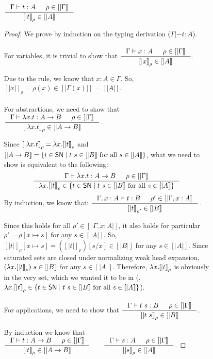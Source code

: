 \begin{figure}
\begin{theorem}
$ \inference{\Gamma|- t:A & \rho \in [|\Gamma|]}{[|t|]_\rho \in [|A|]} $
\end{theorem}
\begin{proof}
We prove by induction on the typing derivation ($\Gamma|- t:A$).
\paragraph{}
For variables, it is trivial to show that
$ \inference{\Gamma |- x:A & \rho \in [|\Gamma|]}{[|x|]_\rho \in [|A|]} $.

Due to the  rule, we know that $x:A \in \Gamma$.
So, $[|x|]_\rho =\rho(x)\in[|\Gamma(x)|] = [|A|]$.

\paragraph{}
For abstractions, we need to show that
$ \inference{\Gamma |- \l x.t : A -> B & \rho \in [|\Gamma|]}
	     {[|\l x.t|]_\rho \in [|A -> B|]} $.

Since $[|\lambda x.t|]_\rho = \lambda x.[|t|]_\rho$ and
$[|A -> B|] = \{ t\in \mathsf{SN} \mid t~s\in[|B|]~\text{for all}~s\in[|A|] \}$,
what we need to show is equivalent to the following:
\[ \inference{\Gamma |- \l x.t : A -> B & \rho \in [|\Gamma|]}
	     {\l x.[|t|]_\rho \in
		\{ t\in \SN \mid t~s\in[|B|] ~\text{for all}~ s\in[|A|] \} }
\]
By induction, we know that:
$ \inference{\Gamma,x:A |- t : B & \rho' \in [|\Gamma,x:A|]}
	     {[|t|]_{\rho'} \in [|B|]} $.

Since this holds for all $\rho' \in [|\Gamma,x:A|]$, it also holds
for particular $\rho' = \rho[x \mapsto s]$ for any $s \in [|A|]$.
So, $[|t|]_\rho[x\mapsto s] = ([|t|]_\rho)[s/x]\in[|B|]$ for any $s\in[|A|]$.
Since saturated sets are closed under normalizing weak head expansion,
$(\lambda x.[|t|]_\rho)~s \in[|B|]$ for any $s\in[|A|]$.
Therefore, $\lambda x.[|t|]_\rho$ is obviously in the very set,
which we wanted it to be in (\ie,
$\lambda x.[|t|]_\rho\in\{t\in \mathsf{SN} \mid t~s\in[|B|] ~\text{for all}~ s\in[|A|]\}$).

\paragraph{}
For applications, we need to show that
$ \inference{\Gamma |- t~s : B & \rho\in[|\Gamma|]}{[|t~s|]_\rho \in [|B|]} $.

By induction we know that
$
\inference{\Gamma |- t : A -> B & \rho\in[|\Gamma|]}{[|t|]_\rho \in [|A -> B|]}
\qquad
\inference{\Gamma |- s : A & \rho\in[|\Gamma|]}{[|s|]_\rho \in [|A|]}
$.


\end{proof}
\end{figure}
